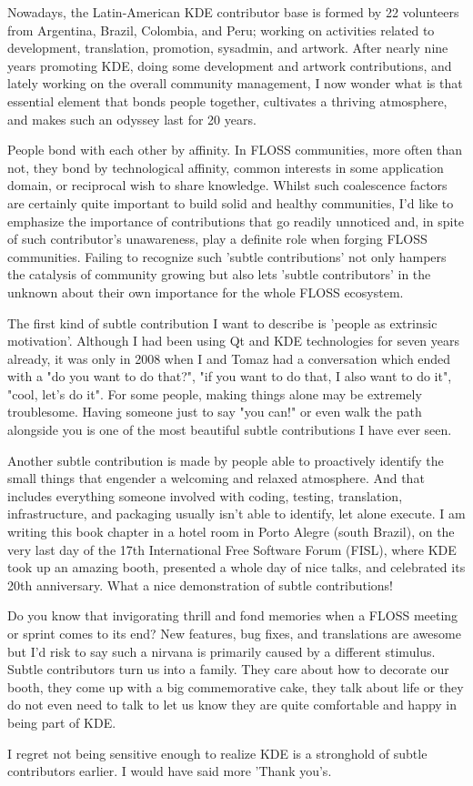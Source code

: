 Nowadays, the Latin-American KDE contributor base is formed by 22 volunteers from Argentina, Brazil, Colombia, and Peru; working on activities related to development, translation, promotion, sysadmin, and artwork. After nearly nine years promoting KDE, doing some development and artwork contributions, and lately working on the overall community management, I now wonder what is that essential element that bonds people together, cultivates a thriving atmosphere, and makes such an odyssey last for 20 years.

People bond with each other by affinity. In FLOSS communities, more often than not, they bond by technological affinity, common interests in some application domain, or reciprocal wish to share knowledge. Whilst such coalescence factors are certainly quite important to build solid and healthy communities, I'd like to emphasize the importance of contributions that go readily unnoticed and, in spite of such contributor's unawareness, play a definite role when forging FLOSS communities. Failing to recognize such 'subtle contributions' not only hampers the catalysis of community growing but also lets 'subtle contributors' in the unknown about their own importance for the whole FLOSS ecosystem.

The first kind of subtle contribution I want to describe is 'people as extrinsic motivation'. Although I had been using Qt and KDE technologies for seven years already, it was only in 2008 when I and Tomaz had a conversation which ended with a "do you want to do that?", "if you want to do that, I also want to do it", "cool, let's do it". For some people, making things alone may be extremely troublesome. Having someone just to say "you can!" or even walk the path alongside you is one of the most beautiful subtle contributions I have ever seen.

Another subtle contribution is made by people able to proactively identify the small things that engender a welcoming and relaxed atmosphere. And that includes everything someone involved with coding, testing, translation, infrastructure, and packaging usually isn't able to identify, let alone execute. I am writing this book chapter in a hotel room in Porto Alegre (south Brazil), on the very last day of the 17th International Free Software Forum (FISL), where KDE took up an amazing booth, presented a whole day of nice talks, and celebrated its 20th anniversary. What a nice demonstration of subtle contributions!

Do you know that invigorating thrill and fond memories when a FLOSS meeting or sprint comes to its end? New features, bug fixes, and translations are awesome but I'd risk to say such a nirvana is primarily caused by a different stimulus. Subtle contributors turn us into a family. They care about how to decorate our booth, they come up with a big commemorative cake, they talk about life or they do not even need to talk to let us know they are quite comfortable and happy in being part of KDE.

I regret not being sensitive enough to realize KDE is a stronghold of subtle contributors earlier. I would have said more 'Thank you's.
